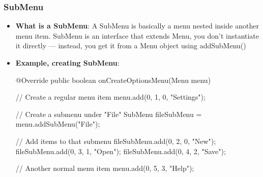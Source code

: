 \documentclass{report}
\begin{document}
    \pagebreak 
    \subsubsection{SubMenu}
    \begin{itemize}
        \item \textbf{What is a SubMenu}: A SubMenu is basically a menu nested inside another menu item. SubMenu is an interface that extends Menu, you don’t instantiate it directly — instead, you get it from a Menu object using addSubMenu()
            \bigbreak \noindent 
        \item \textbf{Example, creating SubMenu}:
            \bigbreak \noindent 
            \begin{javacode}
                @Override
                public boolean onCreateOptionsMenu(Menu menu) {
                    // Create a regular menu item
                    menu.add(0, 1, 0, "Settings");

                    // Create a submenu under "File"
                    SubMenu fileSubMenu = menu.addSubMenu("File");

                    // Add items to that submenu
                    fileSubMenu.add(0, 2, 0, "New");
                    fileSubMenu.add(0, 3, 1, "Open");
                    fileSubMenu.add(0, 4, 2, "Save");

                    // Another normal menu item
                    menu.add(0, 5, 3, "Help");

}
\end{javacode}
\end{itemize}
\end{document}

